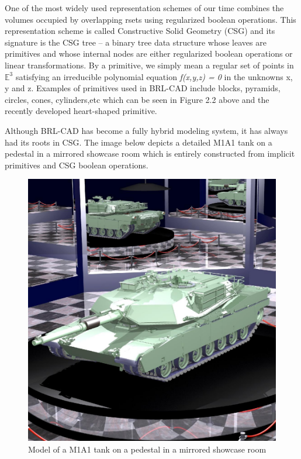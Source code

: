 \hspace{30} One of the most widely used representation schemes of our time
combines the volumes occupied by overlapping r­sets using regularized
boolean operations. This representation scheme is called Constructive Solid
Geometry (CSG) and its signature is the CSG tree – a binary tree data
structure whose leaves are primitives and whose internal nodes are either
regularized boolean operations or linear transformations. By a primitive, we
simply mean a regular set of points in $\mathbb{E}^3$ satisfying an irreducible
polynomial equation \textit{f(x,y,z) = 0} in the unknowns x, y and z. Examples of
primitives used in BRL-­CAD include blocks, pyramids, circles, cones,
cylinders,etc which can be seen in Figure 2.2 above and the recently developed
heart­-shaped primitive. 

\hspace{30} Although   BRL-­CAD   has   become   a   fully   hybrid   modeling   system,   it   has  
always   had   its   roots   in   CSG.   The   image   below   depicts   a   detailed   M1A1   tank   on  
a   pedestal   in   a   mirrored   showcase   room   which   is   entirely   constructed   from  
implicit primitives and CSG boolean operations.  

\begin{figure}[htbp]
\centering
\includegraphics[trim=0.0cm 0.5cm 0.1cm 0.1cm, clip=true, totalheight=0.5\textheight]{Pictures/M1A1.png}
\caption[Model of a M1A1 tank on a pedestal in a mirrored showcase room]{Model of a M1A1 tank on a pedestal in a mirrored showcase room}
\label{M1A1}
\end{figure}  


